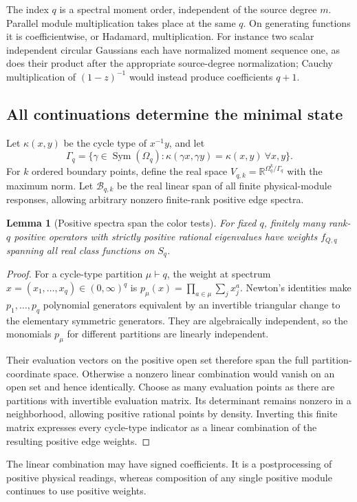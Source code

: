 \documentclass[11pt,a4paper]{amsart}
\numberwithin{equation}{section}
\newtheorem{lemma}[theorem]{Lemma}
\theoremstyle{definition}
\theoremstyle{remark}
\newcommand{\R}{\mathbb R}
\begin{document}
The index $q$ is a spectral moment order, independent of the source degree $m$. Parallel module multiplication takes place at the same $q$. On generating functions it is coefficientwise, or Hadamard, multiplication. For instance two scalar independent circular Gaussians each have normalized moment sequence one, as does their product after the appropriate source-degree normalization; Cauchy multiplication of $(1-z)^{-1}$ would instead produce coefficients $q+1$.

\subsection{All continuations determine the minimal state}
Let $\kappa(x,y)$ be the cycle type of $x^{-1}y$, and let
\[
 \Gamma_q=\{\gamma\in\operatorname{Sym}(\Omega_q):
            \kappa(\gamma x,\gamma y)=\kappa(x,y)\ \forall x,y\}.
\]
For $k$ ordered boundary points, define the real space
$V_{q,k}=\R^{\Omega_q^k/\Gamma_q}$
with the maximum norm. Let $\mathcal B_{q,k}$ be the real linear span of all finite physical-module responses, allowing arbitrary nonzero finite-rank positive edge spectra.

\begin{lemma}[Positive spectra span the color tests]\label{lem:positivecolors}
For fixed $q$, finitely many rank-$q$ positive operators with strictly positive rational eigenvalues have weights $f_{Q,q}$ spanning all real class functions on $S_q$.
\end{lemma}
\begin{proof}
For a cycle-type partition $\mu\vdash q$, the weight at spectrum $x=(x_1,\ldots,x_q)\in(0,\infty)^q$ is
$p_\mu(x)=\prod_{a\in\mu}\sum_jx_j^a$.
Newton's identities make $p_1,\ldots,p_q$ polynomial generators equivalent by an invertible triangular change to the elementary symmetric generators. They are algebraically independent, so the monomials $p_\mu$ for different partitions are linearly independent.

Their evaluation vectors on the positive open set therefore span the full partition-coordinate space. Otherwise a nonzero linear combination would vanish on an open set and hence identically. Choose as many evaluation points as there are partitions with invertible evaluation matrix. Its determinant remains nonzero in a neighborhood, allowing positive rational points by density. Inverting this finite matrix expresses every cycle-type indicator as a linear combination of the resulting positive edge weights.
\end{proof}
The linear combination may have signed coefficients. It is a postprocessing of positive physical readings, whereas composition of any single positive module continues to use positive weights.
\end{document}
